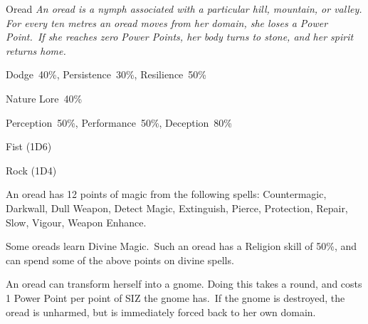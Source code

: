 \begin{monsterbox}{Oread}
	\textit{An oread is a nymph associated with a particular hill, mountain, or valley. For every ten metres an oread moves from her domain, she loses a Power Point. If she reaches zero Power Points, her body turns to stone, and her spirit returns home.}\\
	\rpghline
	\basics[%
        hitpoints  = 11, 
	majorwound = 6,
	damagemodifier = 0,
	powerpoints = 25,
	movementrate = 15m,
	armor = None,
	plunderrating = 1
	]
	\rpghline%
	\stats[ %
		STR = 2D6    (7),
		CON = 3D6+3  (12),
		DEX = 3D6+6  (17),
		SIZ = 2D6+3  (10),
		INT = 3D6+3  (14),
		POW = 2D6+15 (22),
		CHA = 2D6+9  (15)
	]
	\rpghline%
	\begin{rpg-monsteraction}[Resistances]
		Dodge~40\%, Persistence~30\%, Resilience~50\%
	\end{rpg-monsteraction}
	\begin{rpg-monsteraction}[Knowledge]
		Nature Lore~40\%
	\end{rpg-monsteraction}
	\begin{rpg-monsteraction}[Practical]
		Perception~50\%, Performance~50\%, Deception~80\%
	\end{rpg-monsteraction}
	\begin{rpg-monsteraction}
		Fist (1D6)
	\end{rpg-monsteraction}
	\begin{rpg-monsteraction}
		Rock (1D4)
	\end{rpg-monsteraction}
	\begin{rpg-monsteraction}
		An oread has 12 points of magic from the following spells: Countermagic, Darkwall, Dull Weapon, Detect Magic, Extinguish, Pierce, Protection, Repair, Slow, Vigour, Weapon Enhance.
	\end{rpg-monsteraction}
	\begin{rpg-monsteraction}
		Some oreads learn Divine Magic. Such an oread has a Religion skill of 50\%, and can spend some of the above points on divine spells.
	\end{rpg-monsteraction}
	\begin{rpg-monsteraction}
		An oread can transform herself into a gnome. Doing this takes a round, and costs 1 Power Point per point of SIZ the gnome has. If the gnome is destroyed, the oread is unharmed, but is immediately forced back to her own domain.
	\end{rpg-monsteraction}

\end{monsterbox}

